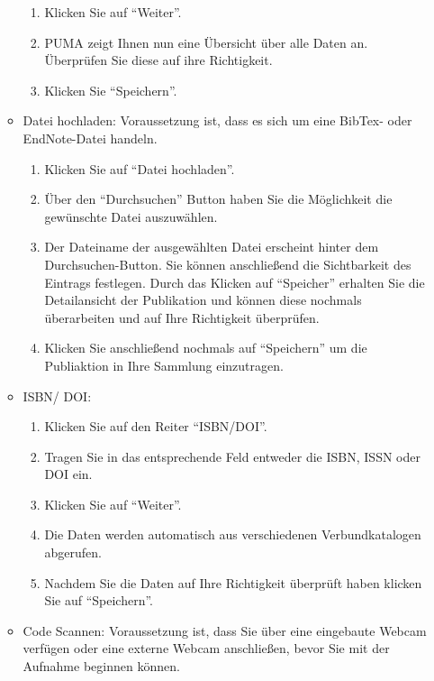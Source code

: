 \documentclass[a4paper,11pt,twoside]{scrbook}
\begin{document}
\begin{enumerate}
\begin{itemize}
\begin{enumerate}
            \item Klicken Sie auf \enquote{Weiter}.
            \item PUMA zeigt Ihnen nun eine Übersicht über alle Daten an. Überprüfen Sie diese auf ihre Richtigkeit.
            \item Klicken Sie \enquote{Speichern}.
        \end{enumerate}
        \item Datei hochladen:\newline
        Voraussetzung ist, dass es sich um eine BibTex- oder EndNote-Datei handeln.
        \begin{enumerate}
            \item Klicken Sie auf \enquote{Datei hochladen}.
            \item Über den \enquote{Durchsuchen} Button haben Sie die Möglichkeit die gewünschte Datei auszuwählen.
            \item Der Dateiname der ausgewählten Datei erscheint hinter dem Durchsuchen-Button. Sie können anschließend die Sichtbarkeit des Eintrags festlegen. Durch das Klicken auf \enquote{Speicher} erhalten Sie die Detailansicht der Publikation und können diese nochmals überarbeiten und auf Ihre Richtigkeit überprüfen.
            \item Klicken Sie anschließend nochmals auf \enquote{Speichern} um die Publiaktion in Ihre Sammlung einzutragen.
        \end{enumerate}
        \item ISBN/ DOI:
        \begin{enumerate}
            \item Klicken Sie auf den Reiter \enquote{ISBN/DOI}.
            \item Tragen Sie in das entsprechende Feld entweder die ISBN, ISSN oder DOI ein.
            \item Klicken Sie auf \enquote{Weiter}.
            \item Die Daten werden automatisch aus verschiedenen Verbundkatalogen abgerufen.
            \item Nachdem Sie die Daten auf Ihre Richtigkeit überprüft haben klicken Sie auf \enquote{Speichern}.
        \end{enumerate}
        \item Code Scannen: %
        \newline
        Voraussetzung ist, dass Sie über eine eingebaute Webcam verfügen oder eine externe Webcam anschließen, bevor Sie mit der Aufnahme beginnen können.

\end{itemize}
\end{enumerate}
\end{document}
